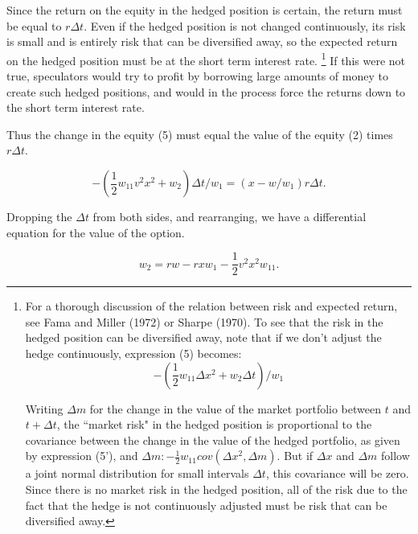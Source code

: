 \documentclass[a4paper, 12pt, twoside]{article}
\begin{document}
\vspace*{1mm}
Since the return on the equity in the hedged position is certain, the return must be 
equal to $r\Delta t$. Even if the hedged position is not changed continuously, its risk is 
small and is entirely risk that can be diversified away, so the expected return on the 
hedged position must be at the short term interest rate. 
\footnote{\linespread{1}\fontsize{10}{10}\selectfont
For a thorough discussion of the relation between risk and expected 
return, see Fama and Miller (1972) or Sharpe (1970). To see that the risk in the 
hedged position can be diversified away, note that if we don't adjust the hedge 
continuously, expression (5) becomes:
\vspace*{1mm}
\begin{equation*}
-\left(\frac{1}{2} w_{11} \Delta x^2+w_2 \Delta t\right)/w_1 \tag{5'}
\end{equation*}

\vspace*{1mm}
\noindent Writing $\Delta m$ for the change in the value of the market portfolio 
between $t$ and $t+\Delta t$, the 
``market risk" in the hedged position is proportional to the covariance between the 
change in the value of the hedged portfolio, as given by expression (5'), 
and $\Delta m: -\frac{1}{2} w_{11} cov(\Delta x^2,\Delta m)$. 
But if $\Delta x$ and $\Delta m$ follow a joint normal distribution for small 
intervals $\Delta t$, this covariance will be zero. 
Since there is no market risk in the 
hedged position, all of the risk due to the fact that the hedge is not continuously 
adjusted must be risk that can be diversified away.
}
If this were not true, speculators would try to profit by borrowing large amounts of money to create such 
hedged positions, and would in the process force the returns down to the short term 
interest rate.

Thus the change in the equity (5) must equal the value of the equity (2) times $r\Delta t$.

\begin{equation}
-\left(\frac{1}{2} w_{11} v^2 x^2+w_2 \right)\Delta t/w_1 =(x-w/w_1) r\Delta t.
\end{equation}

\vspace*{1mm}
\noindent Dropping the $\Delta t$ from both sides, and rearranging, we have a differential equation for 
the value of the option.

\begin{equation}
w_2=rw-rxw_1- \frac{1}{2} v^2 x^2 w_{11}.
\end{equation}
\end{document}
